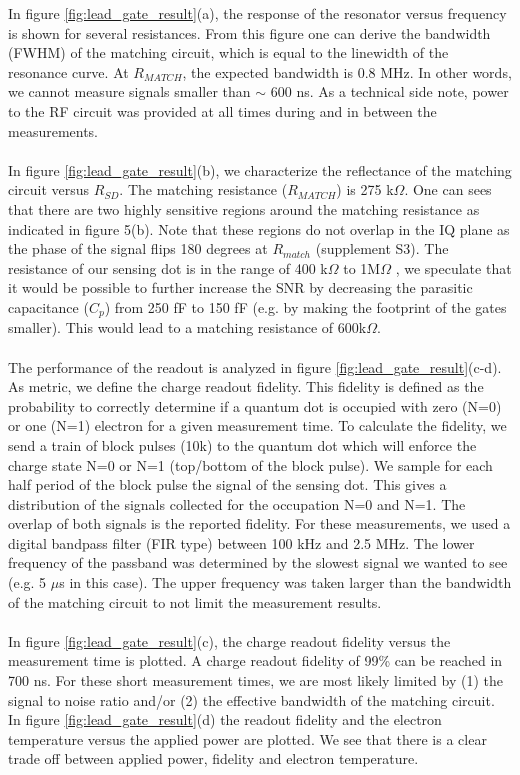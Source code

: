 \documentclass{article}
\begin{document}
In figure \ref{fig:lead_gate_result}(a), the response of the resonator versus frequency is shown for several resistances. From this figure one can derive the bandwidth (FWHM) of the matching circuit, which is equal to the linewidth of the resonance curve. At $R_{MATCH}$, the expected bandwidth is 0.8 MHz. In other words, we cannot measure signals smaller than $\sim$ 600 ns. As a technical side note, power to the RF circuit was provided at all times during and in between the measurements.
\\ \\
In figure \ref{fig:lead_gate_result}(b), we characterize the reflectance of the matching circuit versus $R_{SD}$. The matching resistance ($R_{MATCH}$) is 275 k$\Omega$. One can sees that there are two highly sensitive regions around the matching resistance as indicated in figure 5(b). Note that these regions do not overlap in the IQ plane as the phase of the signal flips 180 degrees at $R_{match}$ (supplement S3). 
The resistance of our sensing dot is in the range of 400 k$\Omega$ to 1M$\Omega$ , we speculate that it would be possible to further increase the SNR by decreasing the parasitic capacitance ($C_p$) from 250 fF to 150 fF (e.g. by making the footprint of the gates smaller). This would lead to a matching resistance of 600k$\Omega$.
\\ \\
The performance of the readout is analyzed in figure \ref{fig:lead_gate_result}(c-d). As metric, we define the charge readout fidelity. This fidelity is defined as the probability to correctly determine if a quantum dot is occupied with zero (N=0) or one (N=1) electron for a given measurement time. To calculate the fidelity, we send a train of block pulses (10k) to the quantum dot which will enforce the charge state N=0 or N=1 (top/bottom of the block pulse). We sample for each half period of the block pulse the signal of the sensing dot. This gives a distribution of the signals collected for the occupation N=0 and N=1. The overlap of both signals is the reported fidelity. For these measurements, we used a digital bandpass filter (FIR type) between 100 kHz and 2.5 MHz. The lower frequency of the passband was determined by the slowest signal we wanted to see (e.g. 5 $\mu$s in this case). The upper frequency was taken larger than the bandwidth of the matching circuit to not limit the measurement results.
\\ \\
In figure \ref{fig:lead_gate_result}(c), the charge readout fidelity versus the measurement time is plotted. A charge readout fidelity of 99\% can be reached in 700 ns. For these short measurement times, we are most likely limited by (1) the signal to noise ratio and/or (2) the effective bandwidth of the matching circuit. In figure \ref{fig:lead_gate_result}(d) the readout fidelity and the electron temperature versus the applied power are plotted. We see that there is a clear trade off between applied power, fidelity and electron temperature.  
\end{document}
